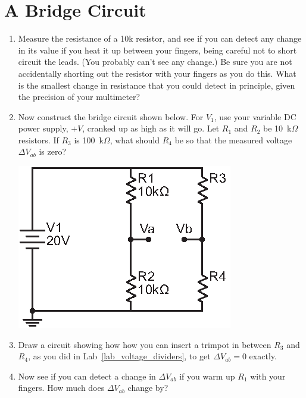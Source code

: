 \section{A Bridge Circuit}
\label{lab_bridge}


\bigskip

\begin{enumerate}[wide]

\item Measure the resistance of a 10k resistor, and see if you can detect any change in its value if you heat it up between your fingers, being careful not to short circuit the leads.  (You probably can't see any change.)  Be sure you are not accidentally shorting out the resistor with your fingers as you do this.  What is the smallest change in resistance that you could detect in principle, given the precision of your multimeter?

\item Now construct the bridge circuit shown below.  For $V_1$, use your variable DC power supply, $+V$, cranked up as high as it will go.  Let $R_1$ and $R_2$ be 10~k$\Omega$ resistors.  If $R_3$ is 100~k$\Omega$, what should $R_4$ be so that the measured voltage $\Delta V_{ab}$ is zero?  


\begin{center}
\includegraphics{bridge_circuit/bridge.eps}
\end{center}


\item Draw a circuit showing how how you can insert a trimpot in between $R_3$ and $R_4$, as you did in Lab~\ref{lab_voltage_dividers}, to get $\Delta V_{ab} = 0$ exactly.
	
\item Now see if you can detect a change in $\Delta V_{ab}$ if you warm up $R_1$ with your fingers.  How much does $\Delta V_{ab}$ change by?


\end{enumerate}
